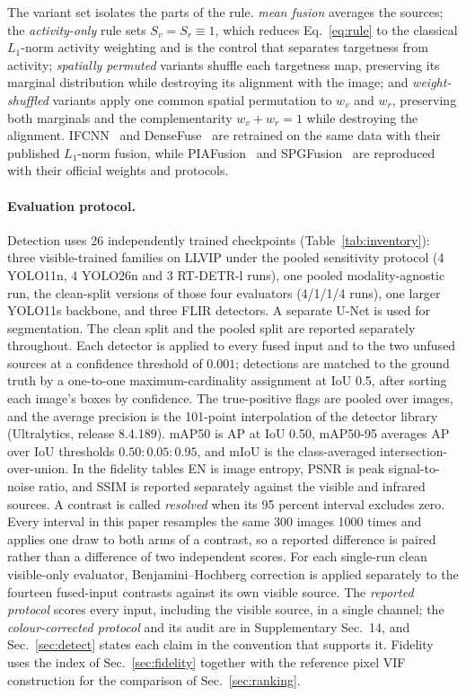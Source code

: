 \documentclass[preprint,10pt]{elsarticle}
\begin{document}
\begin{sloppypar}
The variant set isolates the parts of the rule. \emph{mean fusion} averages the
sources; the \emph{activity-only} rule sets $S_v=S_r\equiv1$, which reduces
Eq.~\eqref{eq:rule} to the classical $L_1$-norm activity weighting and is the control
that separates targetness from activity; \emph{spatially permuted} variants shuffle
each targetness map, preserving its marginal distribution while destroying its
alignment with the image; and \emph{weight-shuffled} variants apply one common spatial
permutation to $w_v$ and $w_r$, preserving both marginals and the complementarity
$w_v+w_r=1$ while destroying the alignment. IFCNN~\cite{zhang2020} and
DenseFuse~\cite{li2019} are retrained on the same data with their published
$L_1$-norm fusion, while PIAFusion~\cite{tang2022} and SPGFusion~\cite{zhang2026} are
reproduced with their official weights and protocols.
\end{sloppypar}

\paragraph{Evaluation protocol.} Detection uses 26 independently trained checkpoints
(Table~\ref{tab:inventory}): three visible-trained families on LLVIP under the pooled
sensitivity protocol (4 YOLO11n, 4 YOLO26n and 3 RT-DETR-l runs), one pooled
modality-agnostic run, the clean-split versions of those four evaluators
(4/1/1/4 runs), one larger YOLO11s backbone, and three FLIR detectors. A separate U-Net
is used for segmentation. The clean split and the pooled split are reported separately
throughout.
Each detector is applied to every fused input and to the two unfused sources at a
confidence threshold of $0.001$; detections are matched to
the ground truth by a one-to-one maximum-cardinality assignment at IoU 0.5, after sorting
each image's boxes by confidence. The true-positive flags are pooled over images, and the
average precision is the 101-point interpolation of the detector library (Ultralytics,
release 8.4.189). mAP50 is AP at IoU 0.50, mAP50-95 averages AP over IoU thresholds
$0.50{:}0.05{:}0.95$, and mIoU is the class-averaged intersection-over-union. In the
fidelity tables EN is image entropy, PSNR is peak signal-to-noise ratio, and SSIM is
reported separately against the visible and infrared sources. A contrast is called
\emph{resolved} when its 95 percent interval excludes zero. Every interval in this paper resamples the same 300 images
1000 times and applies one draw to both arms of a contrast, so a reported difference
is paired rather than a difference of two independent scores. For each single-run
clean visible-only evaluator, Benjamini--Hochberg correction is applied separately to
the fourteen fused-input contrasts against its own visible source. The
\emph{reported protocol} scores every input, including the visible source, in a single
channel; the \emph{colour-corrected protocol} and its audit are in
Supplementary Sec.~14, and Sec.~\ref{sec:detect} states each claim in the convention
that supports it. Fidelity uses the index of Sec.~\ref{sec:fidelity} together with the
reference pixel VIF construction for the comparison of Sec.~\ref{sec:ranking}.
\end{document}

